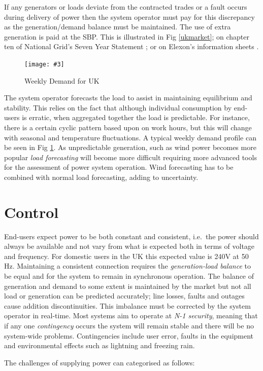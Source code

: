 \documentclass[a4paper,oneside,12pt]{report}
\newcommand{\image}[3] {
  \begin{figure}
    \begin{center}
      \texttt{[image: \#3]}
      \caption{#2}
      \label{#1}
    \end{center}
  \end{figure}
}
\begin{document}
If any generators or loads deviate from the contracted trades or a fault occurs during delivery of power then the system operator must pay for this discrepancy as the generation/demand balance must be maintained. The use of extra generation is paid at the SBP. This is illustrated in Fig \ref{ukmarket}; on chapter ten of National Grid's Seven Year Statement \cite{Grid2007}; or on Elexon's information sheets \cite{Elexon}.

\image{weeklydemand}{Weekly Demand for UK}{weeklydemand.png}

The system operator forecasts the load to assist in maintaining equilibrium and stability. This relies on the fact that although individual consumption by end-users is erratic, when aggregated together the load is predictable. For instance, there is a certain cyclic pattern based upon on work hours, but this will change with seasonal and temperature fluctuations. A typical weekly demand profile can be seen in Fig \ref{weeklydemand}. As unpredictable generation, such as wind power becomes more popular \emph{load forecasting} will become more difficult requiring more advanced tools for the assessment of power system operation. Wind forecasting has to be combined with normal load forecasting, adding to uncertainty.

\section{Control}

End-users expect power to be both constant and consistent, i.e.\ the power should always be available and not vary from what is expected both in terms of voltage and frequency. For domestic users in the UK this expected value is 240V at 50 Hz. Maintaining a consistent connection requires the \emph{generation-load balance} to be equal and for the system to remain in synchronous operation. The balance of generation and demand to some extent is maintained by the market but not all load or generation can be predicted accurately; line losses, faults and outages cause addition discontinuities. This imbalance must be corrected by the system operator in real-time. Most systems aim to operate at \emph{N-1 security}, meaning that if any one \emph{contingency} occurs the system will remain stable and there will be no system-wide problems. Contingencies include user error, faults in the equipment and environmental effects such as lightning and freezing rain.

The challenges of supplying power can categorised as follows:
\end{document}
